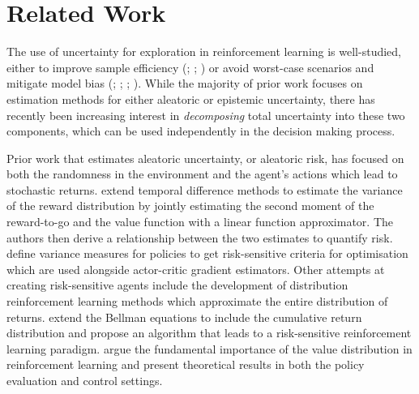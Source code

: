 \section{Related Work} %
\label{S:related-work}
The use of uncertainty for exploration in reinforcement learning is well-studied, either to improve sample efficiency (\cite{schneider1997exploiting}; \cite{jung2010gaussian}; \cite{deisenroth2011pilco}) or avoid worst-case scenarios and mitigate model bias (\cite{bagnell2001solving}; \cite{nilim2005robust}; \cite{kahn2017uncertainty}; \cite{deisenroth2013gaussian}). While the majority of prior work focuses on estimation methods for either aleatoric or epistemic uncertainty, there has recently been increasing interest in \textit{decomposing} total uncertainty into these two components, which can be used independently in the decision making process.

Prior work that estimates aleatoric uncertainty, or aleatoric risk, has focused on both the randomness in the environment and the agent's actions which lead to stochastic returns. \citet{tamar2016learning} extend temporal difference methods to estimate the variance of the reward distribution by jointly estimating the second moment of the reward-to-go and the value function with a linear function approximator. The authors then derive a relationship between the two estimates to quantify risk. \citet{prashanth2013actor} define variance measures for policies to get risk-sensitive criteria for optimisation which are used alongside actor-critic gradient estimators. Other attempts at creating risk-sensitive agents include the development of distribution reinforcement learning methods which approximate the entire distribution of returns. \citet{morimura2010nonparametric} extend the Bellman equations to include the cumulative return distribution and propose an algorithm that leads to a risk-sensitive reinforcement learning paradigm. \citet{bellemare2017distributional} argue the fundamental importance of the value distribution in reinforcement learning and present theoretical results in both the policy evaluation and control settings. 

